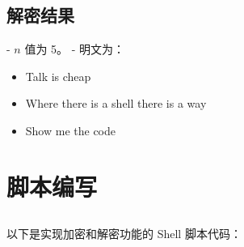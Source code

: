 \documentclass[12pt,hyperref,a4paper,UTF8]{ctexart}
\begin{document}
\subsection{解密结果}
- \( n \) 值为 5。
- 明文为：
\begin{itemize}
    \item Talk is cheap
    \item Where there is a shell there is a way
    \item Show me the code
\end{itemize}

\section{脚本编写}

\subsection{}

以下是实现加密和解密功能的 Shell 脚本代码：
\end{document}
